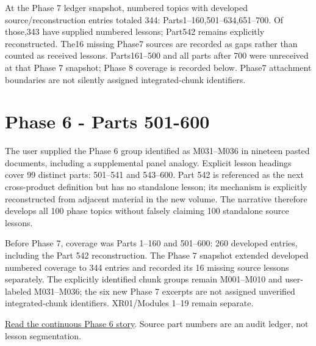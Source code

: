 At the Phase 7 ledger snapshot, numbered topics with developed source/reconstruction entries totaled 344: Parts1--160,501--634,651--700. Of those,343 have supplied numbered lessons; Part542 remains explicitly reconstructed. The16 missing Phase7 sources are recorded as gaps rather than counted as received lessons. Parts161--500 and all parts after 700 were unreceived at that Phase 7 snapshot; Phase 8 coverage is recorded below. Phase7 attachment boundaries are not silently assigned integrated-chunk identifiers.

\section{Phase 6 - Parts 501-600}\label{appendix-fd090d982a15-phase-6---parts-501-600}

The user supplied the Phase 6 group identified as M031--M036 in nineteen pasted documents, including a supplemental panel analogy. Explicit lesson headings cover 99 distinct parts: 501--541 and 543--600. Part 542 is referenced as the next cross-product definition but has no standalone lesson; its mechanism is explicitly reconstructed from adjacent material in the new volume. The narrative therefore develops all 100 phase topics without falsely claiming 100 standalone source lessons.

Before Phase 7, coverage was Parts 1--160 and 501--600: 260 developed entries, including the Part 542 reconstruction. The Phase 7 snapshot extended developed numbered coverage to 344 entries and recorded its 16 missing source lessons separately. The explicitly identified chunk groups remain M001--M010 and user-labeled M031--M036; the six new Phase 7 excerpts are not assigned unverified integrated-chunk identifiers. XR01/Modules 1--19 remain separate.

\href{Continuous\%20Notes/Computing\%20Foundations\%20-\%20From\%20Bits\%20to\%20C++\%20and\%20Systems\%20APIs\#The\%20panel\%20gives\%20us\%20a\%20reason\%20to\%20learn}{Read the continuous Phase 6 story}. Source part numbers are an audit ledger, not lesson segmentation.

